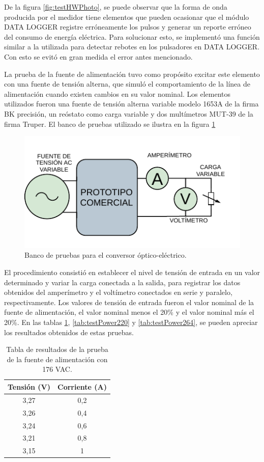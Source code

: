 De la figura \ref{fig:testHWPhoto}, se puede observar que la forma de onda producida por el medidor tiene elementos que pueden ocasionar que el módulo DATA LOGGER registre erróneamente los pulsos y generar un reporte erróneo del consumo de energía eléctrica. Para solucionar esto, se implementó una función similar a la utilizada para detectar rebotes en los pulsadores en DATA LOGGER. Con esto se evitó en gran medida el error antes mencionado.

La prueba de la fuente de alimentación tuvo como propósito excitar este elemento con una fuente de tensión alterna, que simuló el comportamiento de la línea de alimentación cuando existen cambios en su valor nominal. Los elementos utilizados fueron una fuente de tensión alterna variable modelo 1653A de la firma BK precisión, un reóstato como carga variable y dos multímetros MUT-39 de la firma Truper. El banco de pruebas utilizado se ilustra en la figura \ref{fig:testHWBankPower}

\begin{figure}[ht]
	\centering
	\includegraphics[scale=1.1]{./Figures/test_power_bank.pdf}
	\caption{Banco de pruebas para el conversor óptico-eléctrico.}
	\label{fig:testHWBankPower}
\end{figure}

El procedimiento consistió en establecer el nivel de tensión de entrada en un valor determinado y variar la carga conectada a la salida, para registrar los datos obtenidos del amperímetro y el voltímetro conectados en serie y paralelo, respectivamente. Los valores de tensión de entrada fueron el valor nominal de la fuente de alimentación, el valor nominal menos el 20\% y el valor nominal más el 20\%. En las tablas \ref{tab:testPower176}, \ref{tab:testPower220} y \ref{tab:testPower264}, se pueden apreciar los resultados obtenidos de estas pruebas.


\begin{table}[h]
	\centering
	\caption[Prueba de la fuente de alimentación 176 VAC]{Tabla de resultados de la prueba de la fuente de alimentación con 176 VAC.}
	\begin{tabular}{c c}    
		\toprule
		\textbf{Tensión (V)} & \textbf{Corriente (A)} \\
		\midrule
		3,27 & 0,2 \\		
		3,26 & 0,4 \\		
		3,24 & 0,6 \\
		3,21 & 0,8 \\
		3,15 & 1 \\		
		\bottomrule
		\hline
	\end{tabular}
	\label{tab:testPower176}
\end{table}

